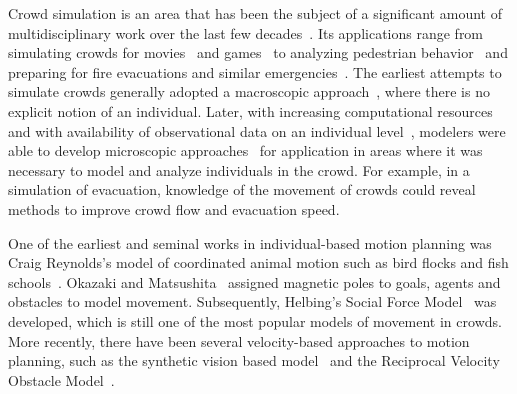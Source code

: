 Crowd simulation is an area that has been the subject of a significant amount of multidisciplinary work over the last few decades~\cite{Still:2000tp,Zhou:2010:CMS:1842722.1842725,Gwynne1999741}. Its applications range from simulating crowds for movies~\cite{Regelous:2011vt,Reynolds:1987vm} and games~\cite{Snape:2012,ageOfEmpires:2013} to analyzing pedestrian behavior~\cite{PhysRevE.51.4282,Viswanathan:ut,Guy:2010uv} and preparing for fire evacuations and similar emergencies~\cite{Klupfel:2005to,PEDFull:2011,Mordvintsev:2012}. The earliest attempts to simulate crowds generally adopted a macroscopic approach~\cite{Henderson:1974ve,WattsJr:1987tx}, where there is no explicit notion of an individual.
Later, with increasing computational resources and with availability of observational data on an individual level~\cite{CGF:CGF1090, HuNan2013, JOHANSSON2008}, modelers were able to develop microscopic approaches~\cite{Reynolds:1987vm,PhysRevE.51.4282} for application in areas where it was necessary to model and analyze individuals in the crowd.
For example, in a simulation of evacuation, knowledge of the movement of crowds could reveal methods to improve crowd flow and evacuation speed.

One of the earliest and seminal works in individual-based motion planning was Craig Reynolds's model of coordinated animal motion such as bird flocks and fish schools~\cite{Reynolds:1987vm}. Okazaki and Matsushita~\cite{Okazaki:1993wh} assigned magnetic poles to goals, agents and obstacles to model movement. Subsequently, Helbing's Social Force Model~\cite{PhysRevE.51.4282} was developed, which is still one of the most popular models of movement in crowds. More recently, there have been several velocity-based approaches to motion planning, such as the synthetic vision based model~\cite{Ondrej:2010hv} and the Reciprocal Velocity Obstacle Model~\cite{vandenBerg:2011ww,Guy:2010ko,vandenBerg:2008fu}.


